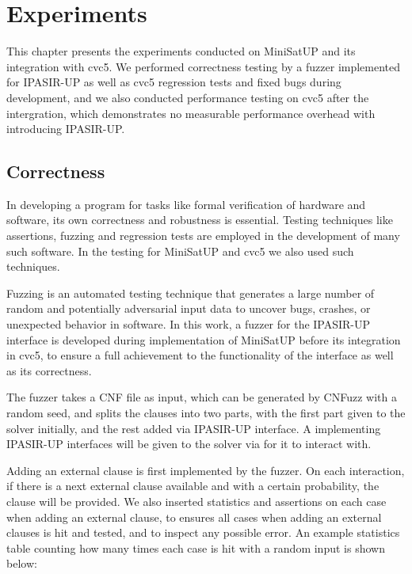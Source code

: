 \chapter{Experiments}

This chapter presents the experiments conducted on MiniSatUP and its integration with cvc5. We performed correctness testing by a fuzzer implemented for IPASIR-UP as well as cvc5 regression tests and fixed bugs during development, and we also conducted performance testing on cvc5 after the intergration, which demonstrates no measurable performance overhead with introducing IPASIR-UP.

\section{Correctness}

In developing a program for tasks like formal verification of hardware and software, its own correctness and robustness is essential. Testing techniques like assertions, fuzzing and regression tests are employed in the development of many such software. In the testing for MiniSatUP and cvc5 we also used such techniques.

Fuzzing is an automated testing technique that generates a large number of random and potentially adversarial input data to uncover bugs, crashes, or unexpected behavior in software. In this work, a fuzzer for the IPASIR-UP interface is developed during implementation of MiniSatUP before its integration in cvc5, to ensure a full achievement to the functionality of the interface as well as its correctness.

The fuzzer takes a CNF file as input, which can be generated by CNFuzz \cite{BrummayerLonsingBiere-SAT10} with a random seed, and splits the clauses into two parts, with the first part given to the solver initially, and the rest added via IPASIR-UP interface. A  implementing IPASIR-UP interfaces will be given to the solver via  for it to interact with.

Adding an external clause is first implemented by the fuzzer. On each interaction, if there is a next external clause available and with a certain probability, the clause will be provided. We also inserted statistics and assertions on each case when adding an external clause, to ensures all cases when adding an external clauses is hit and tested, and to inspect any possible error. An example statistics table counting how many times each case is hit with a random input is shown below:

